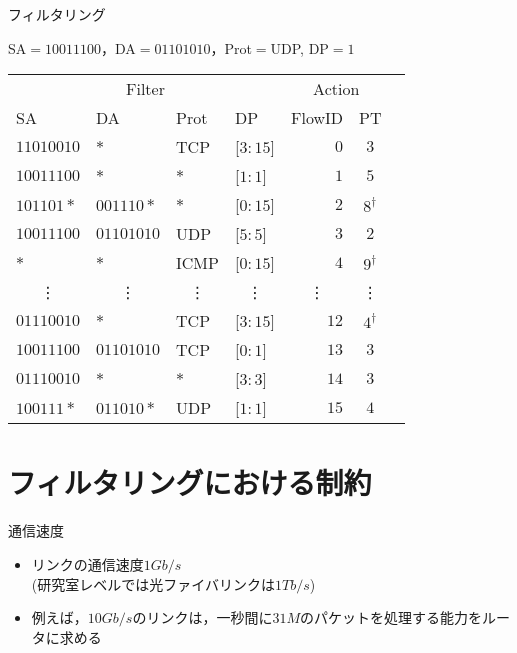 \documentclass[12pt,dvipdfmx,mathserif,uplatex,aspectratio=32]{beamer}
\begin{document}
\begin{frame}{フィルタリング}

{\centering
SA$=10011100$，DA$=01101010$，Prot$=$UDP, DP$=1$

}
\begin{table}
{\centering

 {\small
 \begin{tabular}{|l|l|l|l||r|c|c} \cline{1-6}
 \multicolumn{4}{|c||}{Filter} & \multicolumn{2}{|c|}{Action} & \\ \cline{1-6}
 SA & DA & Prot & DP & FlowID & PT  & \\ \cline{1-6}
 $11010010$ & $*$        & TCP  & [$3:15$] & $0$  & $3$ & \\
 \color{red}$10011100$ & \color{red}$*$        & \color{red}$*$  & \color{red}[$1:1$]  & \color{red}$1$  & \color{red}$5$ & \\
 $101101*$  & $001110*$  & $*$  & [$0:15$] & $2$  & $8^{\dagger}$ & \\
 $10011100$ & $01101010$ & UDP  & [$5:5$]  & $3$  & $2$ & \\
 $*$        & $*$        & ICMP & [$0:15$] & $4$  & $9^{\dagger}$ & \\
 \multicolumn{1}{|c}{\vdots} & \multicolumn{1}{|c}{\vdots} & \multicolumn{1}{|c}{\vdots} & \multicolumn{1}{|c||}{\vdots} & \multicolumn{1}{|c}{\vdots} & \multicolumn{1}{|c|}{\vdots} & \\
 $01110010$ & $*$        & TCP  & [$3:15$] & $12$ & $4^{\dagger}$ & \\
 $10011100$ & $01101010$ & TCP  & [$0:1$]  & $13$ & $3$ & \\
 $01110010$ & $*$        & $*$  & [$3:3$]  & $14$ & $3$ & \\
\color{red}$100111*$  & \color{red}$011010*$  & \color{red}UDP  & \color{red}[$1:1$]  & \color{red}$15$ & \color{red}$4$ & \color{red}{\LARGE $\Leftarrow$} \\ \cline{1-6}
 \end{tabular}

 }

}
\end{table}

\end{frame}


\section{フィルタリングにおける制約}


\begin{frame}{通信速度}

\begin{itemize}
 \item リンクの通信速度$1Gb/s$ \\
\vspace{1mm}
(研究室レベルでは光ファイバリンクは$1Tb/s$)
 \vspace{5mm}
 \item 例えば，$10Gb/s$のリンクは，一秒間に$31M$のパケットを処理する能力をルータに求める
\end{itemize}

\end{frame}
\end{document}
